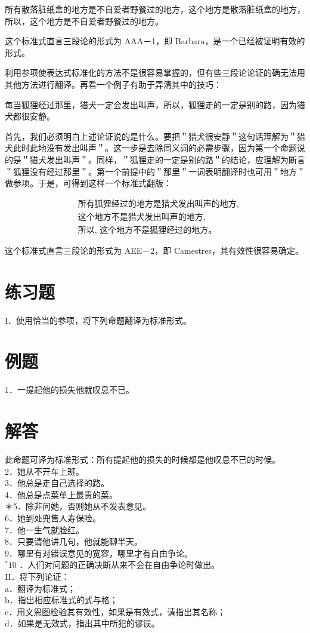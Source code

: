 所有散落脏纸盒的地方是不自爱者野餐过的地方，这个地方是散落脏纸盒的地方，所以，这个地方是不自爱者野餐过的地方。

这个标准式直言三段论的形式为 AAA－1，即 Barbara，是一个已经被证明有效的形式。

利用参项使表达式标准化的方法不是很容易掌握的，但有些三段论论证的确无法用其他方法进行翻译。再看一个例子有助于弄清其中的技巧：

每当狐狸经过那里，猎犬一定会发出叫声，所以，狐狸走的一定是别的路，因为猎犬都很安静。

首先，我们必须明白上述论证说的是什么。要把＂猎犬很安静＂这句话理解为＂猎犬此时此地没有发出叫声＂。这一步是去除同义词的必需步骤，因为第一个命题说的是＂猎犬发出叫声＂。同样，＂狐狸走的一定是别的路＂的结论，应理解为断言＂狐狸没有经过那里＂。第一个前提中的＂那里＂一词表明翻译时也可用＂地方＂做参项。于是，可得到这样一个标准式翻版：

$$
\begin{aligned}
& \text { 所有狐狸经过的地方是猎犬发出叫声的地方, } \\
& \text { 这个地方不是猎犬发出叫声的地方, } \\
& \text { 所以, 这个地方不是狐狸经过的地方。 }
\end{aligned}
$$

这个标准式直言三段论的形式为 AEE－2，即 Camestres，其有效性很容易确定。

\section*{练习题}
I．使用恰当的参项，将下列命题翻译为标准形式。

\section*{例题}
1．一提起他的损失他就叹息不已。

\section*{解答}
此命题可译为标准形式：所有提起他的损失的时候都是他叹息不已的时候。\\
2．她从不开车上班。\\
3．他总是走自己选择的路。\\
4．他总是点菜单上最贵的菜。\\
＊5．除非问她，否则她从不发表意见。\\
6．她到处兜售人寿保险。\\
7．他一生气就脸红。\\
8．只要请他讲几句，他就能聊半天。\\
9．哪里有对错误意见的宽容，哪里才有自由争论。\\
${ }^{*} 10$ ．人们对问题的正确决断从来不会在自由争论时做出。\\
II．将下列论证：\\
a．翻译为标准式；\\
b．指出相应标准式的式与格；\\
c．用文恩图检验其有效性，如果是有效式，请指出其名称；\\
d．如果是无效式，指出其中所犯的谬误。

